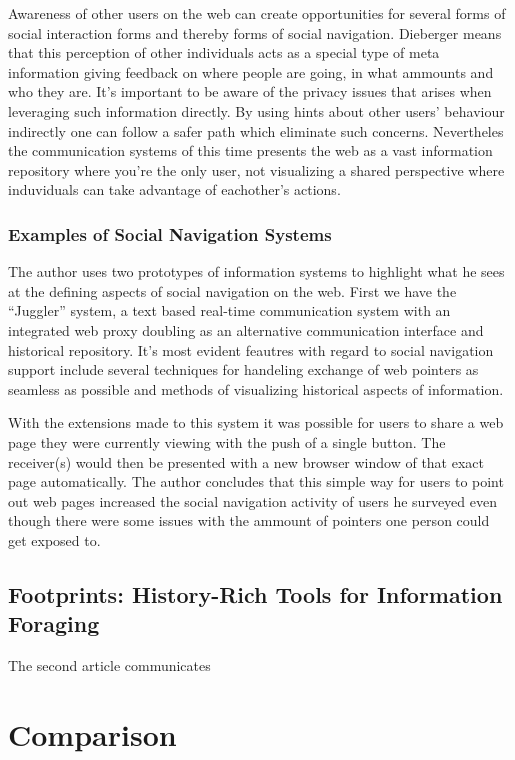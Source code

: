 \documentclass[12pt,a4paper]{article}
\begin{document}
Awareness of other users on the web can create opportunities for several forms
of social interaction forms and thereby forms of social navigation. Dieberger
means that this perception of other individuals acts as a special type of meta
information giving feedback on where people are going, in what ammounts and
who they are. It's important to be aware of the privacy issues that arises
when leveraging such information directly. By using hints about other users'
behaviour indirectly one can follow a safer path which eliminate such
concerns. Nevertheles the communication systems of this time presents the web
as a vast information repository where you're the only user, not visualizing a
shared perspective where induviduals can take advantage of eachother's
actions.

\subsubsection{Examples of Social Navigation Systems}

The author uses two prototypes of information systems to highlight what he
sees at the defining aspects of social navigation on the web. First we have
the ``Juggler'' system, a text based real-time communication system
with an integrated web proxy doubling as an alternative communication
interface and historical repository. It's most evident feautres with
regard to social navigation support include several techniques for handeling
exchange of web pointers as seamless as possible and methods of visualizing
historical aspects of information.

With the extensions made to this system it was possible for users to share a
web page they were currently viewing with the push of a single button. The
receiver(s) would then be presented with a new browser window of that exact
page automatically. The author concludes that this simple way for users to
point out web pages increased the social navigation activity of users he
surveyed even though there were some issues with the ammount of pointers
one person could get exposed to.

\subsection{Footprints: History-Rich Tools for Information Foraging}

The second article \cite{wexelblat99} communicates

\section{Comparison}
\end{document}
